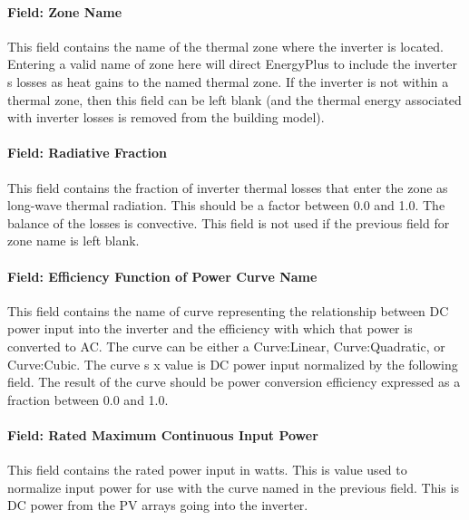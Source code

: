 \paragraph{Field: Zone Name}\label{field-zone-name-2-001}

This field contains the name of the thermal zone where the inverter is located. Entering a valid name of zone here will direct EnergyPlus to include the inverter s losses as heat gains to the named thermal zone. If the inverter is not within a thermal zone, then this field can be left blank (and the thermal energy associated with inverter losses is removed from the building model).

\paragraph{Field: Radiative Fraction}\label{field-radiative-fraction-2}

This field contains the fraction of inverter thermal losses that enter the zone as long-wave thermal radiation. This should be a factor between 0.0 and 1.0. The balance of the losses is convective. This field is not used if the previous field for zone name is left blank.

\paragraph{Field: Efficiency Function of Power Curve Name}\label{field-efficiency-function-of-power-curve-name}

This field contains the name of curve representing the relationship between DC power input into the inverter and the efficiency with which that power is converted to AC. The curve can be either a Curve:Linear, Curve:Quadratic, or Curve:Cubic. The curve s x value is DC power input normalized by the following field. The result of the curve should be power conversion efficiency expressed as a fraction between 0.0 and 1.0.

\paragraph{Field: Rated Maximum Continuous Input Power}\label{field-rated-maximum-continuous-input-power}

This field contains the rated power input in watts. This is value used to normalize input power for use with the curve named in the previous field. This is DC power from the PV arrays going into the inverter.

